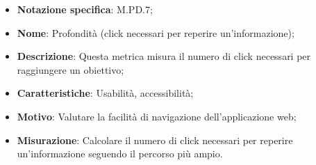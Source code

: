 \begin{itemize}
    \item \textbf{Notazione specifica}: M.PD.7;
    \item \textbf{Nome}: Profondità (click necessari per reperire un'informazione);
    \item \textbf{Descrizione}: Questa metrica misura il numero di click necessari per raggiungere un obiettivo;
    \item \textbf{Caratteristiche}: Usabilità, accessibilità;
    \item \textbf{Motivo}: Valutare la facilità di navigazione dell'applicazione web;
    \item \textbf{Misurazione}: Calcolare il numero di click necessari per reperire un'informazione seguendo il percorso più ampio.
\end{itemize}
